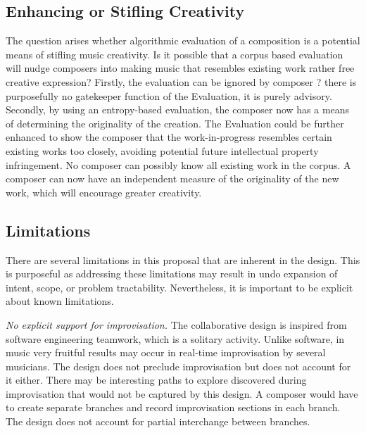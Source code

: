 \documentclass[final,authoryear,5p,times,twocolumn]{elsarticle}
\begin{document}



\subsection{Enhancing or Stifling Creativity}

The question arises whether algorithmic evaluation of a composition is a potential means of stifling music creativity. Is it possible that a corpus based evaluation will nudge composers into making music that resembles existing work rather free creative expression? Firstly, the evaluation can be ignored by composer ? there is purposefully no gatekeeper function of the Evaluation, it is purely advisory. Secondly, by using an entropy-based evaluation, the composer now has a means of determining the originality of the creation. The Evaluation could be further enhanced to show the composer that the work-in-progress resembles certain existing works too closely, avoiding potential future intellectual property infringement. No composer can possibly know all existing work in the corpus. A composer can now have an independent measure of the originality of the new work, which will encourage greater creativity.

\subsection{Limitations}

There are several limitations in this proposal that are inherent in the design. This is purposeful as addressing these limitations may result in undo expansion of intent, scope, or problem tractability. Nevertheless, it is important to be explicit about known limitations.

\textit{No explicit support for improvisation.} The collaborative design is inspired from software engineering teamwork, which is a solitary activity. Unlike software, in music very fruitful results may occur in real-time improvisation by several musicians. The design does not preclude improvisation but does not account for it either. There may be interesting paths to explore discovered during improvisation that would not be captured by this design. A composer would have to create separate branches and record improvisation sections in each branch. The design does not account for partial interchange between branches.
\end{document}
